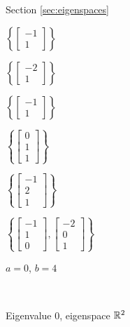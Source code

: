 \begin{multicols}{2}
\begin{enumerate}[label=(\alph*), leftmargin=1\parindent]
\end{enumerate}

\ee

\hspace{-0.25in} Section \ref{sec:eigenspaces}
\obe
\item 
\ba
\item $\left\{\left[ \begin{array}{r} -1 \\ 1 \end{array} \right]\right\}$

\item $\left\{\left[ \begin{array}{r} -2 \\ 1 \end{array} \right]\right\}$

\item $\left\{\left[ \begin{array}{r} -1 \\ 1 \end{array} \right]\right\}$

\item $\left\{\left[ \begin{array}{c} 0 \\ 1 \\ 1 \end{array} \right]\right\}$

\item $\left\{\left[ \begin{array}{r} -1 \\ 2 \\ 1 \end{array} \right]\right\}$

\item $\left\{\left[ \begin{array}{r} -1 \\ 1 \\ 0 \end{array} \right], \left[ \begin{array}{r} -2 \\ 0 \\ 1 \end{array} \right]\right\}$

	\ea


\item $a=0$, $b=4$

\item ~

\ba
\item Eigenvalue $0$, eigenspace $\mathbb{R}^2$


\end{multicols}
